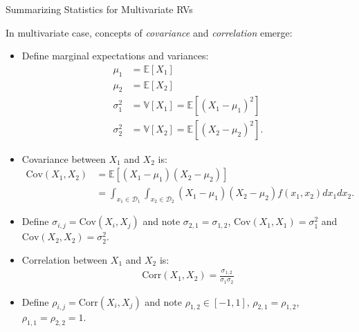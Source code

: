 \documentclass[9pt]{beamer}
\begin{document}
%
\begin{frame}{Summarizing Statistics for Multivariate RVs}

In multivariate case, concepts of {\em covariance} and {\em correlation} emerge:
\begin{itemize}
\setlength{\itemsep}{5pt}
\item Define marginal expectations and variances:
\begin{align*}
\mu_{1}&=\mathbb{E}[X_1]\\
\mu_{2}&=\mathbb{E}[X_2]\\
\sigma_1^2&=\mathbb{V}[X_1]=\mathbb{E}[(X_1-\mu_1)^2]\\
\sigma_2^2&=\mathbb{V}[X_2]=\mathbb{E}[(X_2-\mu_2)^2].
\end{align*}
\item Covariance between $X_1$ and $X_2$ is:
 \begin{align*}
\textrm{Cov}(X_1,X_2)&=\mathbb{E}[(X_1-\mu_1)(X_2-\mu_2)]\\
&=\int_{x_1\in \mathcal{D}_1}\int_{x_2\in\mathcal{D}_2}(X_1-\mu_1)(X_2-\mu_2)f(x_1,x_2)dx_1dx_2.
\end{align*}
\item Define $\sigma_{i,j}=\textrm{Cov}(X_i,X_j)$ and note $\sigma_{2,1}=\sigma_{1,2}$, $\textrm{Cov}(X_1,X_1)=\sigma_1^2$ and $\textrm{Cov}(X_2,X_2)=\sigma_2^2$. 
\item Correlation between $X_1$ and $X_2$ is:
 \begin{align*}
\textrm{Corr}(X_1,X_2)=\frac{\sigma_{1,2}}{\sigma_1\sigma_2}
\end{align*}
\item  Define $\rho_{i,j}=\textrm{Corr}(X_i,X_j)$ and note $\rho_{1,2}\in [-1,1]$, $\rho_{2,1}=\rho_{1,2}$, $\rho_{1,1}=\rho_{2,2}=1$. 
\end{itemize}

\end{frame}
\end{document}
